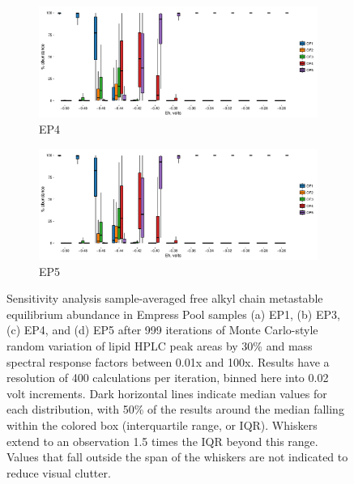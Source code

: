 \begin{figure}[h]\ContinuedFloat
\centering

    \begin{subfigure}[b]{\linewidth}
      	\includegraphics[width=1\linewidth]{"figs_app2/boxplot_ggplot_02bin Empress OF4 iter 999"}
      	\caption{EP4}
        \label{fig:EP4_mc}
    \end{subfigure}
    \begin{subfigure}[b]{\linewidth}
    	\includegraphics[width=1\linewidth]{"figs_app2/boxplot_ggplot_02bin Empress OF5 iter 999"}
    	\caption{EP5}
        \label{fig:EP5_mc}
    \end{subfigure}
    
    \caption[Sensitivity analysis sample-averaged free alkyl chain metastable equilibrium abundance in Empress Pool samples]{Sensitivity analysis sample-averaged free alkyl chain metastable equilibrium abundance in Empress Pool samples (a) EP1, (b) EP3, (c) EP4, and (d) EP5 after 999 iterations of Monte Carlo-style random variation of lipid HPLC peak areas by 30\% and mass spectral response factors between 0.01x and 100x. Results have a resolution of 400 calculations per iteration, binned here into 0.02 volt increments. Dark horizontal lines indicate median values for each distribution, with 50\% of the results around the median falling within the colored box (interquartile range, or IQR). Whiskers extend to an observation 1.5 times the IQR beyond this range. Values that fall outside the span of the whiskers are not indicated to reduce visual clutter.}
    \label{fig:EP_mc}
\end{figure}

